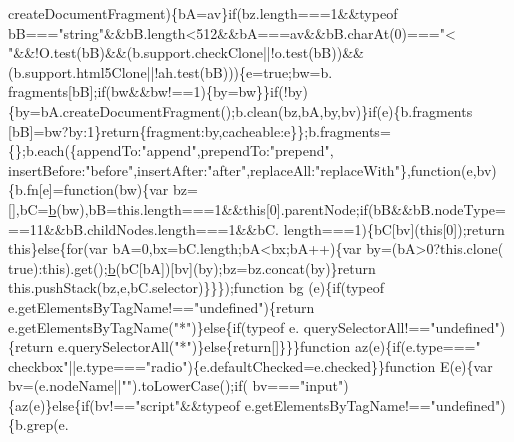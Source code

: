 \begin{DoxyCode}
{      createDocumentFragment)\{bA=av\}\textcolor{keywordflow}{if}(bz.length===1&&typeof bB===\textcolor{stringliteral}{"string"}&&bB.length<512&&bA===av&&bB.charAt(0)===\textcolor{stringliteral}{"<
      "}&&!O.test(bB)&&(b.support.checkClone||!o.test(bB))&&(b.support.html5Clone||!ah.test(bB)))\{e=\textcolor{keyword}{true};bw=b.
      fragments[bB];\textcolor{keywordflow}{if}(bw&&bw!==1)\{by=bw\}\}\textcolor{keywordflow}{if}(!by)\{by=bA.createDocumentFragment();b.clean(bz,bA,by,bv)\}\textcolor{keywordflow}{if}(e)\{b.fragments
      [bB]=bw?by:1\}\textcolor{keywordflow}{return}\{fragment:by,cacheable:e\}\};b.fragments=\{\};b.each(\{appendTo:\textcolor{stringliteral}{"append"},prependTo:\textcolor{stringliteral}{"prepend"},
      insertBefore:\textcolor{stringliteral}{"before"},insertAfter:\textcolor{stringliteral}{"after"},replaceAll:\textcolor{stringliteral}{"replaceWith"}\},\textcolor{keyword}{function}(e,bv)\{b.fn[e]=\textcolor{keyword}{function}(bw)\{var 
      bz=[],bC=\hyperlink{jquery_8js_aa4026ad5544b958e54ce5e106fa1c805}{b}(bw),bB=this.length===1&&\textcolor{keyword}{this}[0].parentNode;\textcolor{keywordflow}{if}(bB&&bB.nodeType===11&&bB.childNodes.length===1&&bC.
      length===1)\{bC[bv](\textcolor{keyword}{this}[0]);\textcolor{keywordflow}{return} \textcolor{keyword}{this}\}\textcolor{keywordflow}{else}\{\textcolor{keywordflow}{for}(var bA=0,bx=bC.length;bA<bx;bA++)\{var by=(bA>0?this.clone(\textcolor{keyword}{
      true}):this).get();\hyperlink{jquery_8js_aa4026ad5544b958e54ce5e106fa1c805}{b}(bC[bA])[bv](by);bz=bz.concat(by)\}\textcolor{keywordflow}{return} this.pushStack(bz,e,bC.selector)\}\}\});\textcolor{keyword}{function} bg
      (e)\{\textcolor{keywordflow}{if}(typeof e.getElementsByTagName!==\textcolor{stringliteral}{"undefined"})\{\textcolor{keywordflow}{return} e.getElementsByTagName(\textcolor{stringliteral}{"*"})\}\textcolor{keywordflow}{else}\{\textcolor{keywordflow}{if}(typeof e.
      querySelectorAll!==\textcolor{stringliteral}{"undefined"})\{\textcolor{keywordflow}{return} e.querySelectorAll(\textcolor{stringliteral}{"*"})\}\textcolor{keywordflow}{else}\{\textcolor{keywordflow}{return}[]\}\}\}\textcolor{keyword}{function} az(e)\{\textcolor{keywordflow}{if}(e.type===\textcolor{stringliteral}{"
      checkbox"}||e.type===\textcolor{stringliteral}{"radio"})\{e.defaultChecked=e.checked\}\}\textcolor{keyword}{function} E(e)\{var bv=(e.nodeName||\textcolor{stringliteral}{""}).toLowerCase();\textcolor{keywordflow}{if}(
      bv===\textcolor{stringliteral}{"input"})\{az(e)\}\textcolor{keywordflow}{else}\{\textcolor{keywordflow}{if}(bv!==\textcolor{stringliteral}{"script"}&&typeof e.getElementsByTagName!==\textcolor{stringliteral}{"undefined"})\{b.grep(e.
}
\end{DoxyCode}
